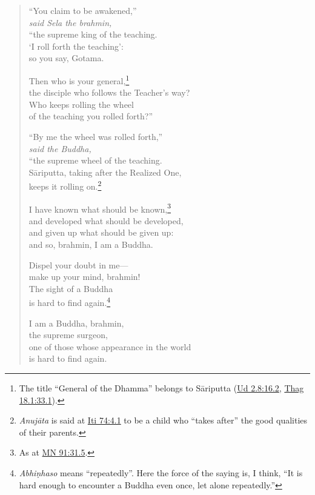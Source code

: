 \documentclass[12pt,openany]{book}%
\newcommand*{\scspeaker}[1]{\hspace{2em}\textit{#1}}
\begin{document}
\begin{verse}
“You claim to be awakened,” \\
\scspeaker{said Sela the brahmin, }\\
“the supreme king of the teaching. \\
‘I roll forth the teaching’: \\
so you say, Gotama. 

Then who is your general,\footnote{The title “General of the Dhamma” belongs to \textsanskrit{Sāriputta} (\href{https://suttacentral.net/ud2.8/en/sujato\#16.2}{Ud 2.8:16.2}, \href{https://suttacentral.net/thag18.1/en/sujato\#33.1}{Thag 18.1:33.1}). } \\
the disciple who follows the Teacher’s way? \\
Who keeps rolling the wheel \\
of the teaching you rolled forth?” 

“By me the wheel was rolled forth,” \\
\scspeaker{said the Buddha, }\\
“the supreme wheel of the teaching. \\
\textsanskrit{Sāriputta}, taking after the Realized One, \\
keeps it rolling on.\footnote{\textit{\textsanskrit{Anujāta}} is said at \href{https://suttacentral.net/iti74/en/sujato\#4.1}{Iti 74:4.1} to be a child who “takes after” the good qualities of their parents. } 

I have known what should be known,\footnote{As at \href{https://suttacentral.net/mn91/en/sujato\#31.5}{MN 91:31.5}. } \\
and developed what should be developed, \\
and given up what should be given up: \\
and so, brahmin, I am a Buddha. 

Dispel your doubt in me—\\
make up your mind, brahmin! \\
The sight of a Buddha \\
is hard to find again.\footnote{\textit{\textsanskrit{Abhiṇhaso}} means “repeatedly”. Here the force of the saying is, I think, “It is hard enough to encounter a Buddha even once, let alone repeatedly.” } 

I am a Buddha, brahmin, \\
the supreme surgeon, \\
one of those whose appearance in the world \\
is hard to find again. 


\end{verse}
\end{document}
